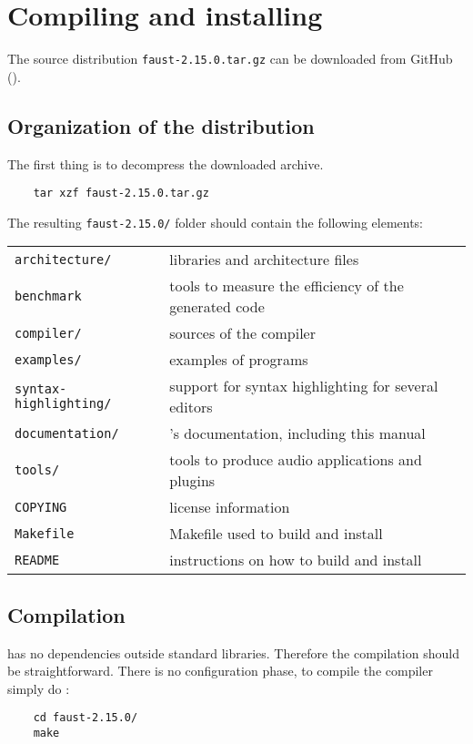\chapter{Compiling and installing \faust}
\label{Compiling}

The \faust source distribution \lstinline'faust-2.15.0.tar.gz' can be downloaded from GitHub ().

\section{Organization of the distribution}
The first thing is to decompress the downloaded archive. 
\begin{lstlisting}
	tar xzf faust-2.15.0.tar.gz
\end{lstlisting}

The resulting  \lstinline'faust-2.15.0/' folder should contain the following elements:

\begin{tabular}{ll}
	\lstinline'architecture/' 		&\faust libraries and architecture files\\
	\lstinline'benchmark'			&tools to measure the efficiency of the generated code\\
	\lstinline'compiler/'			&sources of the \faust compiler\\
	\lstinline'examples/'			&examples of \faust programs\\
	\lstinline'syntax-highlighting/'&	support for syntax highlighting for several editors\\
	\lstinline'documentation/' 		&\faust's documentation, including this manual\\
	\lstinline'tools/'				&tools to produce audio applications and plugins\\
	\lstinline'COPYING'			&license information\\
	\lstinline'Makefile'			&Makefile used to build and install \faust\\
	\lstinline'README'			&instructions on how to build and install \faust
\end{tabular}

\section{Compilation}
\faust has no dependencies outside standard libraries. Therefore the compilation should be straightforward. There is no configuration phase, to compile the \faust compiler simply do :
\begin{lstlisting}
	cd faust-2.15.0/
	make
\end{lstlisting}


